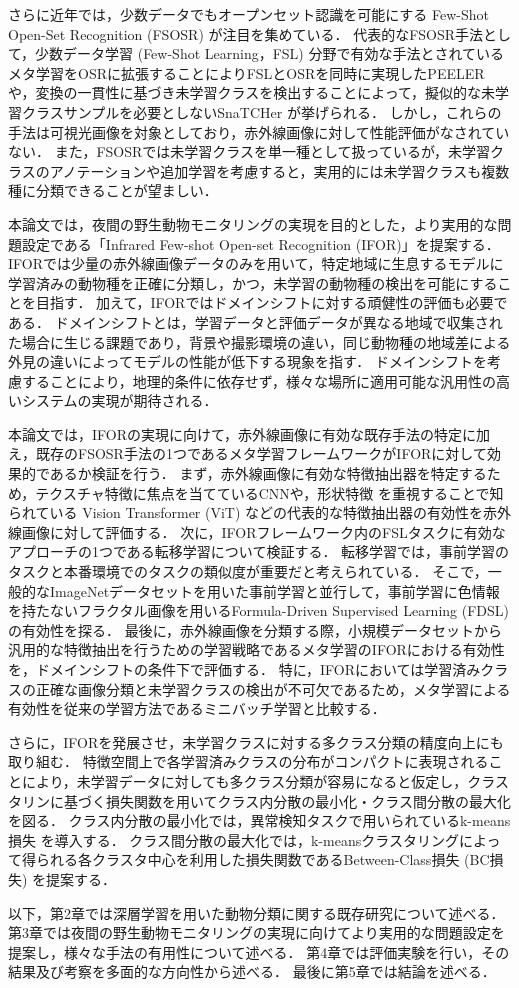 \documentclass[a4paper,11pt,nomag]{jsreport}
\begin{document}
さらに近年では，少数データでもオープンセット認識を可能にする Few-Shot Open-Set Recognition (FSOSR) \cite{peeler} が注目を集めている．
代表的なFSOSR手法として，少数データ学習 (Few-Shot Learning，FSL) 分野で有効な手法とされているメタ学習をOSRに拡張することによりFSLとOSRを同時に実現したPEELER \cite{peeler}や，変換の一貫性に基づき未学習クラスを検出することによって，擬似的な未学習クラスサンプルを必要としないSnaTCHer \cite{snatcher}が挙げられる．
しかし，これらの手法は可視光画像を対象としており，赤外線画像に対して性能評価がなされていない．
また，FSOSRでは未学習クラスを単一種として扱っているが，未学習クラスのアノテーションや追加学習を考慮すると，実用的には未学習クラスも複数種に分類できることが望ましい．

本論文では，夜間の野生動物モニタリングの実現を目的とした，より実用的な問題設定である「Infrared Few-shot Open-set Recognition (IFOR)」を提案する．
IFORでは少量の赤外線画像データのみを用いて，特定地域に生息するモデルに学習済みの動物種を正確に分類し，かつ，未学習の動物種の検出を可能にすることを目指す．
加えて，IFORではドメインシフトに対する頑健性の評価も必要である．
ドメインシフトとは，学習データと評価データが異なる地域で収集された場合に生じる課題であり，背景や撮影環境の違い，同じ動物種の地域差による外見の違いによってモデルの性能が低下する現象を指す．
ドメインシフトを考慮することにより，地理的条件に依存せず，様々な場所に適用可能な汎用性の高いシステムの実現が期待される．

本論文では，IFORの実現に向けて，赤外線画像に有効な既存手法の特定に加え，既存のFSOSR手法の1つであるメタ学習フレームワークがIFORに対して効果的であるか検証を行う．
まず，赤外線画像に有効な特徴抽出器を特定するため，テクスチャ特徴に焦点を当てているCNNや，形状特徴 \cite{feature}を重視することで知られている Vision Transformer (ViT) \cite{vit}などの代表的な特徴抽出器の有効性を赤外線画像に対して評価する．
次に，IFORフレームワーク内のFSLタスクに有効なアプローチの1つである転移学習について検証する．
転移学習では，事前学習のタスクと本番環境でのタスクの類似度が重要だと考えられている．
そこで，一般的なImageNetデータセットを用いた事前学習と並行して，事前学習に色情報を持たないフラクタル画像を用いるFormula-Driven Supervised Learning (FDSL) \cite{fdsl}の有効性を探る．
最後に，赤外線画像を分類する際，小規模データセットから汎用的な特徴抽出を行うための学習戦略であるメタ学習のIFORにおける有効性を，ドメインシフトの条件下で評価する．
特に，IFORにおいては学習済みクラスの正確な画像分類と未学習クラスの検出が不可欠であるため，メタ学習による有効性を従来の学習方法であるミニバッチ学習と比較する．

さらに，IFORを発展させ，未学習クラスに対する多クラス分類の精度向上にも取り組む．
特徴空間上で各学習済みクラスの分布がコンパクトに表現されることにより，未学習データに対しても多クラス分類が容易になると仮定し，クラスタリンに基づく損失関数を用いてクラス内分散の最小化・クラス間分散の最大化を図る．
クラス内分散の最小化では，異常検知タスクで用いられているk-means損失 \cite{k-means} を導入する．
クラス間分散の最大化では，k-meansクラスタリングによって得られる各クラスタ中心を利用した損失関数であるBetween-Class損失 (BC損失) を提案する．

以下，第2章では深層学習を用いた動物分類に関する既存研究について述べる．
第3章では夜間の野生動物モニタリングの実現に向けてより実用的な問題設定を提案し，様々な手法の有用性について述べる．
第4章では評価実験を行い，その結果及び考察を多面的な方向性から述べる．
最後に第5章では結論を述べる．



\end{document}
